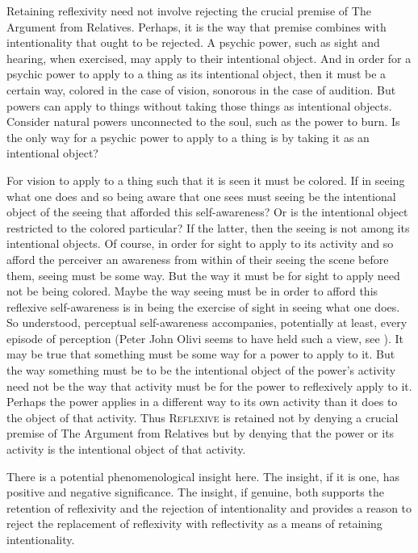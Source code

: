 Retaining reflexivity need not involve rejecting the crucial premise of The Argument from Relatives. Perhaps, it is the way that premise combines with intentionality that ought to be rejected. A psychic power, such as sight and hearing, when exercised, may apply to their intentional object. And in order for a psychic power to apply to a thing as its intentional object, then it must be a certain way, colored in the case of vision, sonorous in the case of audition. But powers can apply to things without taking those things as intentional objects. Consider natural powers unconnected to the soul, such as the power to burn. Is the only way for a psychic power to apply to a thing is by taking it as an intentional object?

For vision to apply to a thing such that it is seen it must be colored. If in seeing what one does and so being aware that one sees must seeing be the intentional object of the seeing that afforded this self-awareness? Or is the intentional object restricted to the colored particular? If the latter, then the seeing is not among its intentional objects. Of course, in order for sight to apply to its activity and so afford the perceiver an awareness from within of their seeing the scene before them, seeing must be some way. But the way it must be for sight to apply need not be being colored. Maybe the way seeing must be in order to afford this reflexive self-awareness is in being the exercise of sight in seeing what one does. So understood, perceptual self-awareness accompanies, potentially at least, every episode of perception (Peter John Olivi seems to have held such a view, see \citealt{Brower-Toland:2024qa}). It may be true that something must be some way for a power to apply to it. But the way something must be to be the intentional object of the power's activity need not be the way that activity must be for the power to reflexively apply to it. Perhaps the power applies in a different way to its own activity than it does to the object of that activity. Thus \textsc{Reflexive} is retained not by denying a crucial premise of The Argument from Relatives but by denying that the power or its activity is the intentional object of that activity.

There is a potential phenomenological insight here. The insight, if it is one, has positive and negative significance. The insight, if genuine, both supports the retention of reflexivity and the rejection of intentionality and provides a reason to reject the replacement of reflexivity with reflectivity as a means of retaining intentionality. 

